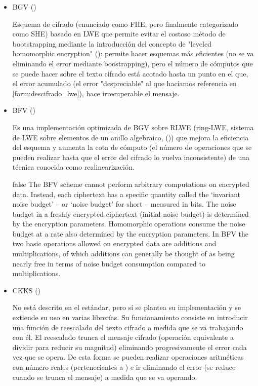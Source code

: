 \begin{itemize}

    \item BGV (\cite{brakerski_leveled_2012})

    Esquema de cifrado (enunciado como FHE, pero finalmente categorizado como SHE) basado en LWE que permite evitar el costoso método de bootstrapping mediante la introducción del concepto de "leveled homomorphic encryption" (\cite{noauthor_homomorphic_nodate-3}): permite hacer esquemas más eficientes (no se va eliminando el error mediante boostrapping), pero el número de cómputos que se puede hacer sobre el texto cifrado está acotado hasta un punto en el que, el error acumulado (el error "despreciable" al que hacíamos referencia en \ref{form:descifrado_lwe}), hace irrecuperable el mensaje.

    \item BFV (\cite{fan_somewhat_2012})

    Es una implementación optimizada de BGV sobre RLWE (ring-LWE, sistema de LWE sobre elementos de un anillo algebraico, (\cite{wikipedia_contributors._anillo_2019})) que mejora la eficiencia del esquema y aumenta la cota de cómputo (el número de operaciones que se pueden realizar hasta que el error del cifrado lo vuelva inconsistente) de una técnica conocida como realinearización.

    \if false
    The BFV scheme cannot perform arbitrary computations on encrypted data.
        Instead, each ciphertext has a specific quantity called the `invariant noise
        budget' -- or `noise budget' for short -- measured in bits. The noise budget
        in a freshly encrypted ciphertext (initial noise budget) is determined by
        the encryption parameters. Homomorphic operations consume the noise budget
        at a rate also determined by the encryption parameters. In BFV the two basic
        operations allowed on encrypted data are additions and multiplications, of
        which additions can generally be thought of as being nearly free in terms of
        noise budget consumption compared to multiplications.
    \fi


    \item CKKS (\cite{cheon_homomorphic_2017})

    No está descrito en el estándar, pero sí se plantea su implementación y se extiende su uso en varias librerías. Su funcionamiento consiste en introducir una función de reescalado del texto cifrado a medida que se va trabajando con él. El reescalado trunca el mensaje cifrado (operación equivalente a dividir para reducir su magnitud) eliminando progresivamente el error cada vez que se opera. De esta forma se pueden realizar operaciones aritméticas con número reales (pertenecientes a ) e ir eliminando el error (se reduce cuando se trunca el mensaje) a medida que se va operando.


\end{itemize}
